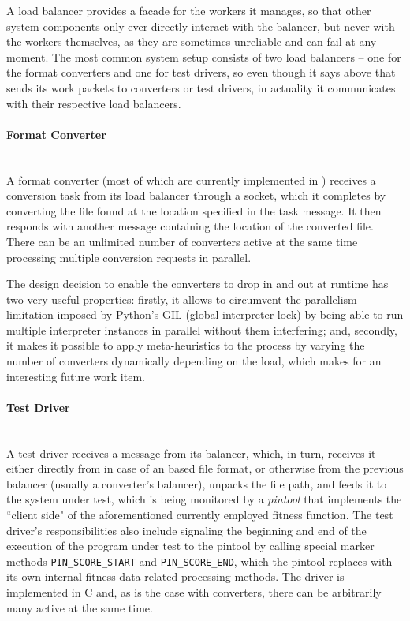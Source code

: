   A load balancer provides a facade for the workers it manages, so that other system components only ever
  directly interact with the balancer, but never with the workers themselves, as they are sometimes unreliable
  and can fail at any moment. The most common system setup consists of two load balancers -- one for the format
  converters and one for test drivers, so even though it says above that \xmlmate sends its work packets to
  converters or test drivers, in actuality it communicates with their respective load balancers. 
  \paragraph{Format Converter} ~\\
  A format converter (most of which are currently implemented in \python) receives a conversion task from
  its load balancer through a \zmq socket, which it completes by converting the file found at the location
  specified in the task message. It then responds with another message containing the location of the converted
  file. There can be an unlimited number of converters active at the same time processing multiple
  conversion requests in parallel. 
  
  The design decision to enable the converters to drop in and out at
  runtime has two very useful properties: firstly, it allows to circumvent the parallelism limitation
  imposed by {\small Python's} GIL (global interpreter lock) by being able to run multiple interpreter
  instances in parallel without them interfering; and, secondly, it makes it possible to apply meta-heuristics
  to the process by varying the number of converters dynamically depending on the load, which makes for an
  interesting future work item.
  \paragraph{Test Driver} ~\\
  A test driver receives a message from its balancer, which, in turn, receives it either directly from
  \xmlmate in case of an \xml based file format, or otherwise from the previous balancer (usually a
  converter's balancer), unpacks the file path, and feeds it to the system under test, which is being monitored
  by a \emph{pintool} that implements the ``client side" of the aforementioned currently employed fitness
  function. The test driver's responsibilities also include signaling the beginning and end of the execution of
  the program under test to the pintool by calling special marker methods \texttt{PIN\_SCORE\_START}
  and \texttt{PIN\_SCORE\_END}, which the pintool replaces with its own internal fitness data related
  processing methods. The driver is implemented in {\small C} and, as is the case with converters, there can
  be arbitrarily many active at the same time.
